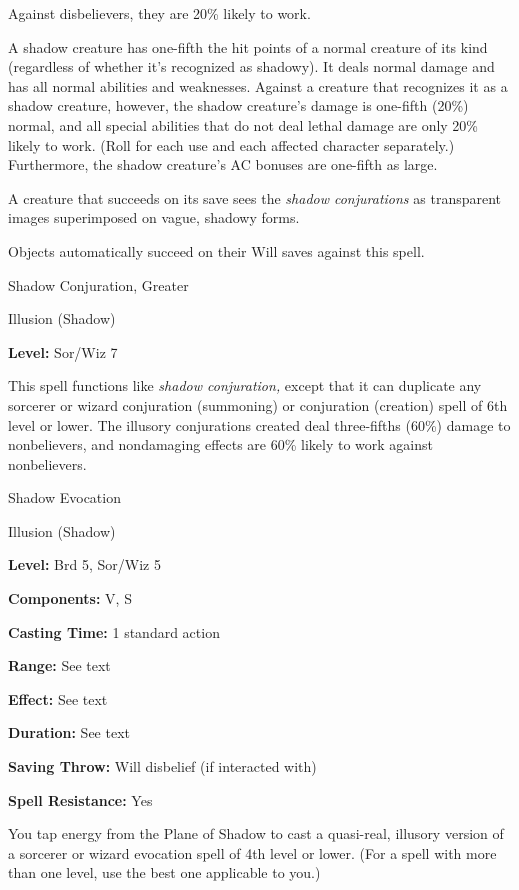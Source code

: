 \documentclass{article}
\begin{document}
Against disbelievers, they are 20\% likely to work.

A shadow creature has one-fifth the hit points of a normal creature of its kind 
(regardless of whether it's recognized as shadowy). It deals normal damage and 
has all normal abilities and weaknesses. Against a creature that recognizes it 
as a shadow creature, however, the shadow creature's damage is one-fifth (20\%) 
normal, and all special abilities that do not deal lethal damage are only 20\% 
likely to work. (Roll for each use and each affected character separately.) Furthermore, 
the shadow creature's AC bonuses are one-fifth as large.

A creature that succeeds on its save sees the \textit{shadow conjurations }as transparent 
images superimposed on vague, shadowy forms.

Objects automatically succeed on their Will saves against this spell.

\vspace{12pt}
Shadow Conjuration, Greater

Illusion (Shadow)

\textbf{Level:} Sor/Wiz 7

This spell functions like \textit{shadow conjuration, }except that it can duplicate 
any sorcerer or wizard conjuration (summoning) or conjuration (creation) spell 
of 6th level or lower. The illusory conjurations created deal three-fifths (60\%) 
damage to nonbelievers, and nondamaging effects are 60\% likely to work against 
nonbelievers.

\vspace{12pt}
Shadow Evocation

Illusion (Shadow)

\textbf{Level:} Brd 5, Sor/Wiz 5

\textbf{Components:} V, S

\textbf{Casting Time:} 1 standard action

\textbf{Range:} See text

\textbf{Effect:} See text

\textbf{Duration:} See text

\textbf{Saving Throw: }Will disbelief (if interacted with)

\textbf{Spell Resistance:} Yes

You tap energy from the Plane of Shadow to cast a quasi-real, illusory version 
of a sorcerer or wizard evocation spell of 4th level or lower. (For a spell with 
more than one level, use the best one applicable to you.)
\end{document}
